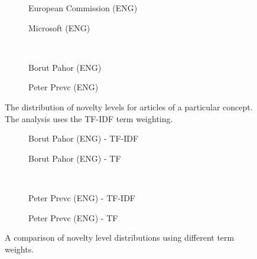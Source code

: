 \documentclass{acm_proc_article-sp}
\begin{document}
\begin{figure}[!htb]
  \begin{subfigure}{.5\textwidth}
    \centering
    \caption{European Commission (ENG)}
    \label{fig:hfig1}
  \end{subfigure}%
  \begin{subfigure}{.5\textwidth}
    \centering
    \caption{Microsoft (ENG)}
    \label{fig:hfig2}
  \end{subfigure}%
  \\
  \begin{subfigure}{.5\textwidth}
    \centering
    \caption{Borut Pahor (ENG)}
    \label{fig:hfig3}
  \end{subfigure}%
  \begin{subfigure}{.5\textwidth}
    \centering
    \caption{Peter Prevc (ENG)}
    \label{fig:hfig4}
  \end{subfigure}%

\caption{The distribution of novelty levels for articles of a particular concept. The analysis uses the TF-IDF term weighting.}
\label{fig:histogram-concepts}
\end{figure}

\begin{figure}[!htb]
  \begin{subfigure}{.5\textwidth}
    \centering
    \caption{Borut Pahor (ENG) - TF-IDF}
    \label{fig:wfig1}
  \end{subfigure}%
  \begin{subfigure}{.5\textwidth}
    \centering
    \caption{Borut Pahor (ENG) - TF}
    \label{fig:wfig2}
  \end{subfigure}%
  \\
   \begin{subfigure}{.5\textwidth}
    \centering
    \caption{Peter Prevc (ENG) - TF-IDF}
    \label{fig:wfig3}
  \end{subfigure}%
  \begin{subfigure}{.5\textwidth}
    \centering
    \caption{Peter Prevc (ENG) - TF}
    \label{fig:wfig4}
  \end{subfigure}%
\caption{A comparison of novelty level distributions using different term weights.}
\label{fig:histogram-weights}
\end{figure}
\end{document}
